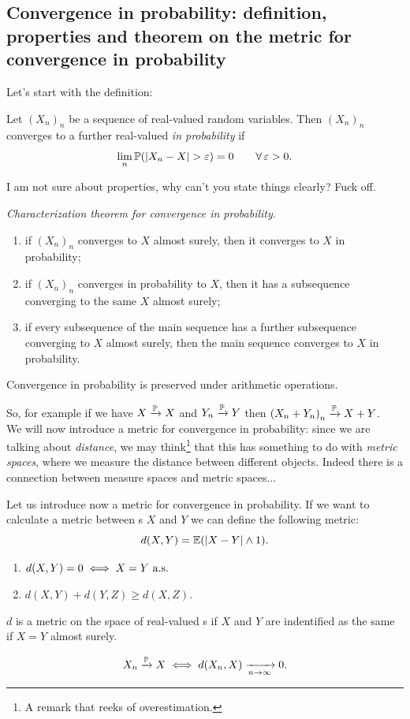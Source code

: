 \documentclass{report}
\begin{document}
\subsection{Convergence in probability: definition, properties and theorem on the metric for
convergence in probability}
Let's start with the definition:
\begin{definition}
	Let ${(X_n)}_{n}$ be a sequence of real-valued random variables. Then ${(X_n)}_{n}$ converges to a further real-valued \rv{} \emph{in probability} if 
	\[\lim_n\pr(|X_n-X|>\varepsilon)=0\qquad\every\varepsilon>0.\]
\end{definition}
I am not sure about properties, why can't you state things clearly? Fuck off. 
\begin{theorem}
	\emph{Characterization theorem for convergence in probability}. 
	\begin{enumerate}[label=\textit{\roman*})]
		\item \label{ehehe} if ${(X_n)}_{n}$ converges to $X$ almost surely, then it converges to $X$ in probability;
		\item \label{ehehe2} if ${(X_n)}_{n}$ converges in probability to $X$, then it has a subsequence converging to the same \rv{} $X$ almost surely;
		\item \label{ehehe3} if every subsequence of the main sequence has a further subsequence converging to $X$ almost surely, then the main sequence converges to $X$ in probability.
	\end{enumerate}
\end{theorem}
\begin{remark}
	Convergence in probability is preserved under arithmetic operations. 
\end{remark}
So, for example if we have $X\xrightarrow[]{\mathbb{P}} X$ and $Y_n\xrightarrow[]{\mathbb{P}} Y$ then ${(X_n+Y_n)}_{n}\xrightarrow[]{\mathbb{P}} X+Y$.\\
We will now introduce a metric for convergence in probability: since we are talking about \textit{distance}, we may think\footnote{A remark that reeks of overestimation.} that this has something to do with \textit{metric spaces}, where we measure the distance between different objects. Indeed there is a connection between measure spaces and metric spaces...\par
Let us introduce now a metric for convergence in probability. If we want to calculate a metric between \rv s $X$ and $Y$ we can define the following metric:
\[d(X,Y)=\mathbb{E}(|X-Y|\wedge1).\]
\begin{remark}
	\begin{enumerate}[\circnum]
		\item $d(X,Y)=0 \iff X=Y\text{ a.s.}$
		\item $d(X,Y)+d(Y,Z)\geq d(X,Z).$
	\end{enumerate}
	$d$ is a metric on the space of real-valued \rv s if $X$ and $Y$ are indentified as the same \rv{} if $X=Y$ almost surely.
\end{remark}
\begin{proposition}
	\[ X_n\xrightarrow[]{\mathbb{P}} X\iff d(X_n,X)\xrightarrow[n\to\infty]{}0. \]
\end{proposition}
\end{document}
